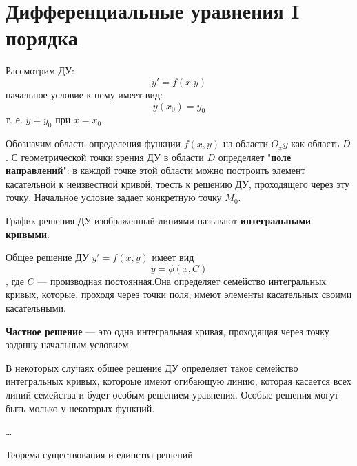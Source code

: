 \documentclass[oneside,final,14pt]{extreport}
\begin{document}
\section{Дифференциальные уравнения I порядка}
Рассмотрим ДУ: \[y'=f(x.y)\] начальное условие к нему имеет вид: \[y(x_0)=y_0\] т. е. $y=y_0$ при $x=x_0$.

Обозначим область определения функции $f(x,y)$ на области $O_xy$ как область $D$. С геометрической точки зрения ДУ в области $D$ определяет "\textbf{поле направлений}": в каждой точке этой области можно построить элемент касательной к неизвестной кривой, тоесть к решению ДУ, проходящего через эту точку. Начальное условие задает конкретную точку $M_0$.

График решения ДУ изображенный линиями называют \textbf{интегральными кривыми}.

Общее решение ДУ $y'=f(x,y)$ имеет вид \[y=\phi (x,C)\], где $C$ --- производная постоянная.Она определяет семейство интегральных кривых, которые, проходя через точки поля, имеют элементы касательных своими касательными.

\textbf{Частное решение} --- это одна интегральная кривая, проходящая через точку заданну начальным условием.

В некоторых случаях общее решение ДУ определяет такое семейство интегральных кривых, котороые имеют огибающую линию, которая касается всех линий семейства и будет особым решением уравнения. Особые решения могут быть молько у некоторых функций.

\dots

Теорема существования и единства решений
\end{document}
